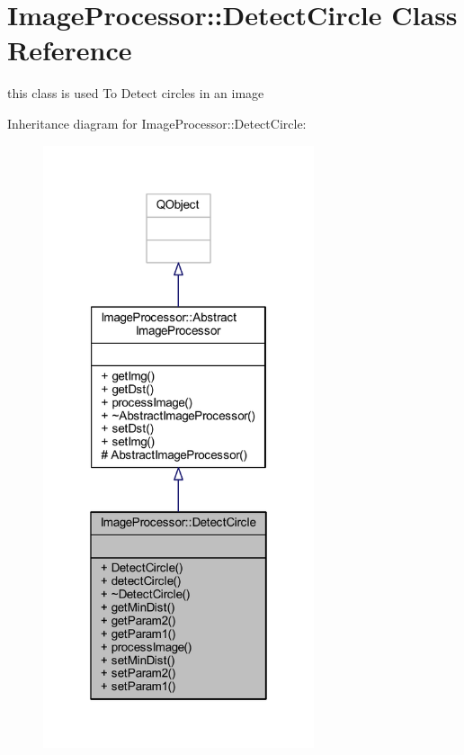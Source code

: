 \hypertarget{class_image_processor_1_1_detect_circle}{}\section{Image\+Processor\+:\+:Detect\+Circle Class Reference}
\label{class_image_processor_1_1_detect_circle}


this class is used To Detect circles in an image  




Inheritance diagram for Image\+Processor\+:\+:Detect\+Circle\+:\nopagebreak
\begin{figure}[H]
\begin{center}
\leavevmode
\includegraphics[width=226pt]{de/dd4/class_image_processor_1_1_detect_circle__inherit__graph}
\end{center}
\end{figure}


